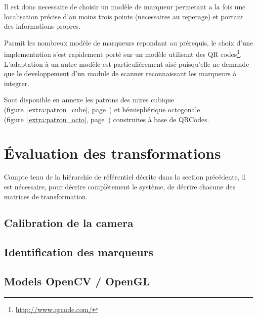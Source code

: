 \documentclass[10pt,a4paper,twoside, twocolumn]{report}
\newcommand*{\rootPath}{../}
\begin{document}
Il est donc necessaire de choisir un modèle de marqueur permetant a la fois une localisation précise d'au moins trois points (necessaires au reperage) et portant des informations propres.

Parmit les nombreux modèle de marqueurs repondant au prérequis, le choix d'une implementation s'est rapidement porté sur un modèle utilisant des QR codes\footnote{\url{http://www.qrcode.com/}}. L'adaptation à un autre modèle est particulièrement aisé puisqu'elle ne demande que le developpement d'un module de scanner reconnaissant les marqueurs à integrer.

Sont disponible en annexe les patrons des mires cubique (figure~\ref{extra:patron_cube}, page~\pageref{extra:patron_cube}) et hémisphérique octogonale (figure~\ref{extra:patron_octo}, page~\pageref{extra:patron_octo}) construites à base de QRCodes.

\section{Évaluation des transformations}

Compte tenu de la hiérarchie de référentiel décrite dans la section précédente, il est nécessaire, pour décrire complètement le système, de décrire chacune des matrices de transformation. 

\subsection{Calibration de la camera}
\subsection{Identification des marqueurs}
\subsection{Models OpenCV / OpenGL}



\ifstandalone
	
	
\fi
\end{document}
